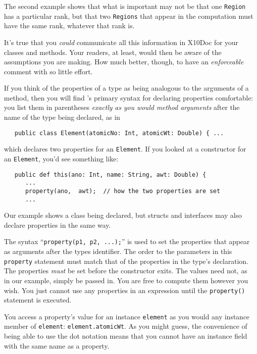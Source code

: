 The second example shows that what is important may not be that
one {\tt Region} has a particular rank, but that
two {\tt Regions} that appear in the computation must have the
same rank, whatever that rank is.  

It's true that you {\em could} communicate all this information in
X10Doc for your classes and methods.
Your readers, at least, would then be aware of the assumptions you are
making.  How much better, though,
 to have an {\em enforceable} comment with so little effort.

If you think of the properties of a type as being analogous to
the arguments of a method, then  you will find \Xten's primary syntax
for declaring properties comfortable: you list them in parentheses
{\em exactly as you would method arguments} after the name of the
type being declared, as in 
\begin{verbatim}
   public class Element(atomicNo: Int, atomicWt: Double) { ...
\end{verbatim}
which declares two properties for an {\tt Element}.  If you looked at a
constructor for an {\tt Element}, you'd see something like:
\begin{verbatim}
   public def this(ano: Int, name: String, awt: Double) {
      ...
      property(ano,  awt);  // how the two properties are set
      ...
\end{verbatim}
Our example shows a class being declared, but structs and interfaces
may also declare properties in the same way.

The syntax ``{\tt property(p1, p2, ...);}'' is used to set the properties
that appear as arguments after the types identifier.  The 
order to the parameters in this {\tt property} statement must match that
of the properties in the type's declaration.  The properties {\em must}
be set before the constructor exits.  The values need not, as in our example,
simply be passed in.   You are free to compute them however you wish.
You just cannot use any properties in an expression
until the {\tt property()} statement is executed.

You access a property's value for an instance {\tt element} as you
would any instance member of {\tt element}: \eg{} {\tt element.atomicWt}.
As you might guess, the convenience of being able to use the dot notation
means that you cannot have an instance field with the same 
name as a property.  


